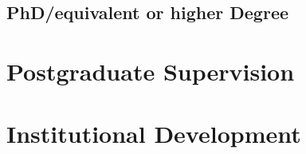 \subsection{PhD/equivalent or higher Degree}

\label{phd}







\section{Postgraduate Supervision}

\label{pgsupervision}




\section{Institutional Development}
\label{institutional development}



